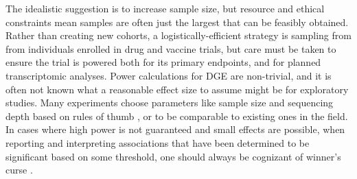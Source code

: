 The idealistic suggestion is to increase sample size, 
but resource and ethical constraints mean samples are often just the largest that can be feasibly obtained.
Rather than creating new cohorts, a logistically-efficient strategy is sampling from from individuals enrolled in drug and vaccine trials,
but care must be taken to ensure the trial is powered both for its primary endpoints,
and for planned transcriptomic analyses.
Power calculations for \gls{DGE} are non-trivial,
and it is often not known what a reasonable effect size to assume might be for exploratory studies.
Many experiments choose parameters like sample size and sequencing depth based on rules of thumb \autocite{conesa2016SurveyBestPractices}, or to be comparable to existing ones in the field.
In cases where high power is not guaranteed and small effects are possible,
when reporting and interpreting associations that have been determined to be significant based on some threshold, 
one should always be cognizant of winner's curse \autocite{huang2018PowerFalseDiscovery}.

